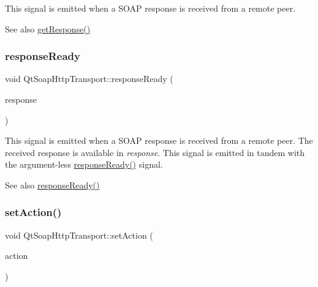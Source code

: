 This signal is emitted when a S\+O\+AP response is received from a remote peer.

\begin{DoxySeeAlso}{See also}
\mbox{\hyperlink{class_qt_soap_http_transport_a85f606ff295d200c387e85a710692c59}{get\+Response()}} 
\end{DoxySeeAlso}
\mbox{\label{class_qt_soap_http_transport_a1d472301bc5c3ec56f204d22c3197c63}} 
\subsubsection{\texorpdfstring{response\+Ready}{responseReady}\hspace{0.1cm}{\footnotesize\ttfamily [2/2]}}
{\footnotesize\ttfamily void Qt\+Soap\+Http\+Transport\+::response\+Ready (\begin{DoxyParamCaption}\item[{const \mbox{\hyperlink{class_qt_soap_message}{Qt\+Soap\+Message}} \&}]{response }\end{DoxyParamCaption})\hspace{0.3cm}{\ttfamily [signal]}}

This signal is emitted when a S\+O\+AP response is received from a remote peer. The received response is available in {\itshape response}. This signal is emitted in tandem with the argument-\/less \mbox{\hyperlink{class_qt_soap_http_transport_a51f909d36a83ee62e0b3dccff3e340cf}{response\+Ready()}} signal.

\begin{DoxySeeAlso}{See also}
\mbox{\hyperlink{class_qt_soap_http_transport_a51f909d36a83ee62e0b3dccff3e340cf}{response\+Ready()}} 
\end{DoxySeeAlso}
\mbox{\label{class_qt_soap_http_transport_af370cf7ff31756ebdc2bb48b2ecb3663}} 
\subsubsection{\texorpdfstring{set\+Action()}{setAction()}}
{\footnotesize\ttfamily void Qt\+Soap\+Http\+Transport\+::set\+Action (\begin{DoxyParamCaption}\item[{const Q\+String \&}]{action }\end{DoxyParamCaption})}

